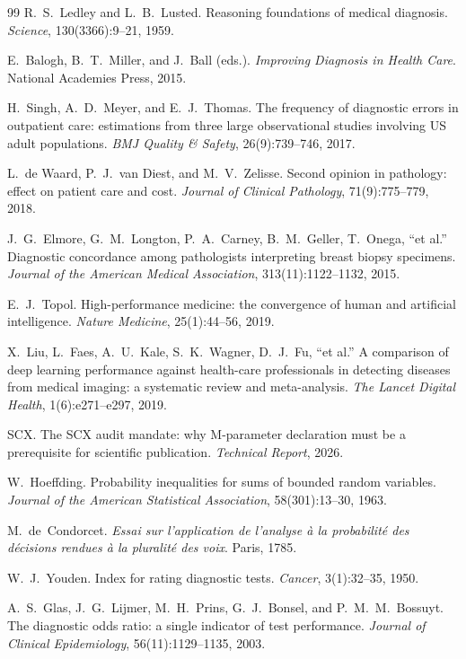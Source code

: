 \documentclass[11pt,a4paper]{article}
\theoremstyle{definition}
\begin{document}
\begin{thebibliography}{99}
R.~S.~Ledley and L.~B.~Lusted.
Reasoning foundations of medical diagnosis.
\textit{Science}, 130(3366):9--21, 1959.

E.~Balogh, B.~T.~Miller, and J.~Ball (eds.).
\textit{Improving Diagnosis in Health Care}.
National Academies Press, 2015.

H.~Singh, A.~D.~Meyer, and E.~J.~Thomas.
The frequency of diagnostic errors in outpatient care: estimations from
three large observational studies involving US adult populations.
\textit{BMJ Quality \& Safety}, 26(9):739--746, 2017.

L.~de Waard, P.~J.~van Diest, and M.~V.~Zelisse.
Second opinion in pathology: effect on patient care and cost.
\textit{Journal of Clinical Pathology}, 71(9):775--779, 2018.

J.~G.~Elmore, G.~M.~Longton, P.~A.~Carney, B.~M.~Geller, T.~Onega, ``et al.''
Diagnostic concordance among pathologists interpreting breast biopsy specimens.
\textit{Journal of the American Medical Association}, 313(11):1122--1132, 2015.

E.~J.~Topol.
High-performance medicine: the convergence of human and artificial intelligence.
\textit{Nature Medicine}, 25(1):44--56, 2019.

X.~Liu, L.~Faes, A.~U.~Kale, S.~K.~Wagner, D.~J.~Fu, ``et al.''
A comparison of deep learning performance against health-care professionals
in detecting diseases from medical imaging: a systematic review and meta-analysis.
\textit{The Lancet Digital Health}, 1(6):e271--e297, 2019.

SCX.
The SCX audit mandate: why M-parameter declaration must be a prerequisite
for scientific publication.
\textit{Technical Report}, 2026.

W.~Hoeffding.
Probability inequalities for sums of bounded random variables.
\textit{Journal of the American Statistical Association}, 58(301):13--30, 1963.

M.~de~Condorcet.
\textit{Essai sur l'application de l'analyse à la probabilité des décisions
rendues à la pluralité des voix}. Paris, 1785.

W.~J.~Youden.
Index for rating diagnostic tests.
\textit{Cancer}, 3(1):32--35, 1950.

A.~S.~Glas, J.~G.~Lijmer, M.~H.~Prins, G.~J.~Bonsel, and P.~M.~M.~Bossuyt.
The diagnostic odds ratio: a single indicator of test performance.
\textit{Journal of Clinical Epidemiology}, 56(11):1129--1135, 2003.

\end{thebibliography}
\end{document}
